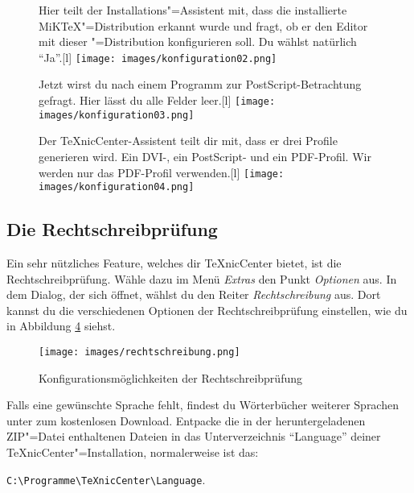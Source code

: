 \begin{figure}[hb]
	\begin{captionbeside}{Hier teilt der Installations"=Assistent mit, dass die installierte MiKTeX"=Distribution erkannt wurde und fragt, ob er den Editor mit dieser \DMLLaTeX"=Distribution konfigurieren soll. Du wählst natürlich \enquote{Ja}.}[l]
		\texttt{[image: images/konfiguration02.png]}
	\end{captionbeside}
	\label{fig:konfiguration02}
\end{figure}

\begin{figure}[ht]
	\begin{captionbeside}{Jetzt wirst du nach einem Programm zur PostScript-Betrachtung gefragt. Hier lässt du alle Felder leer.}[l]
		\texttt{[image: images/konfiguration03.png]}
	\end{captionbeside}
	\label{fig:konfiguration03}
\end{figure}

\begin{figure}[ht]
	\begin{captionbeside}{Der TeXnicCenter-Assistent teilt dir mit, dass er drei Profile generieren wird. Ein DVI-, ein PostScript- und ein PDF-Profil. Wir werden nur das PDF-Profil verwenden.}[l]
		\texttt{[image: images/konfiguration04.png]}
	\end{captionbeside}
	\label{fig:konfiguration04}
\end{figure}

\clearpage %

\subsection{Die Rechtschreibprüfung}

Ein sehr nützliches Feature, welches dir TeXnicCenter bietet, ist die Rechtschreibprüfung. Wähle dazu im Menü \emph{Extras} den Punkt \emph{Optionen} aus. In dem Dialog, der sich öffnet, wählst du den Reiter \emph{Rechtschreibung} aus. Dort kannst du die verschiedenen Optionen der Rechtschreibprüfung einstellen, wie du in Abbildung \ref{fig:rechtschreibung} siehst.

\begin{figure}
	\centering
		\texttt{[image: images/rechtschreibung.png]}
	\caption{Konfigurationsmöglichkeiten der Rechtschreibprüfung}
	\label{fig:rechtschreibung}
\end{figure}

Falls eine gewünschte Sprache fehlt, findest du Wörterbücher weiterer Sprachen unter
zum kostenlosen Download. Entpacke die in der heruntergeladenen ZIP"=Datei enthaltenen Dateien in das Unterverzeichnis \enquote{Language} deiner TeXnicCenter"=Installation, normalerweise ist das:

\verb|C:\Programme\TeXnicCenter\Language|.
